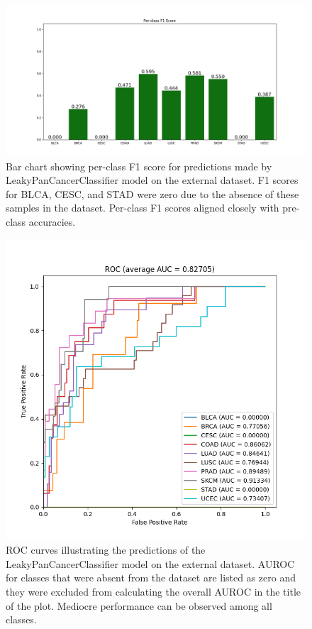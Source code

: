 \documentclass{l4proj}
\begin{document}
\begin{appendices}
\begin{figure}
    \centering
    \includegraphics[width=\linewidth]{images/per_class_f1_ext.png}
    \caption{Bar chart showing per-class F1 score for predictions made by LeakyPanCancerClassifier model on the external dataset. F1 scores for BLCA, CESC, and STAD were zero due to the absence of these samples in the dataset. Per-class F1 scores aligned closely with pre-class accuracies.}
    \label{fig:class-f1-ext}
\end{figure}

\begin{figure}
    \centering
    \includegraphics[width=.75\linewidth]{images/ext_roc.png}
    \caption{ROC curves illustrating the predictions of the LeakyPanCancerClassifier model on the external dataset. AUROC for classes that were absent from the dataset are listed as zero and they were excluded from calculating the overall AUROC in the title of the plot. Mediocre performance can be observed among all classes.}
    \label{fig:ext-roc}
\end{figure}


\end{appendices}
\end{document}
